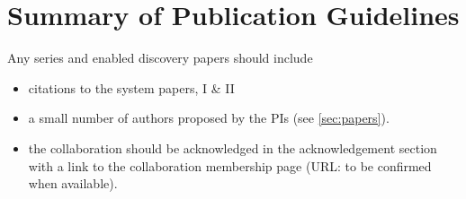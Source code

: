 \documentclass[a4paper]{article}
\begin{document}

\section{Summary of Publication Guidelines}
\label{sec:publ}
Any \sw series and \sw enabled discovery papers should include
\begin{itemize}
\item citations to the \sw system papers, \sw I \& II
\item a small number of \sw authors proposed by the \sw PIs (see \ref{sec:papers}).
\item the collaboration should be acknowledged in the acknowledgement section with a link to the collaboration membership page (URL: to be confirmed when available).
\end{itemize}


\end{document}
